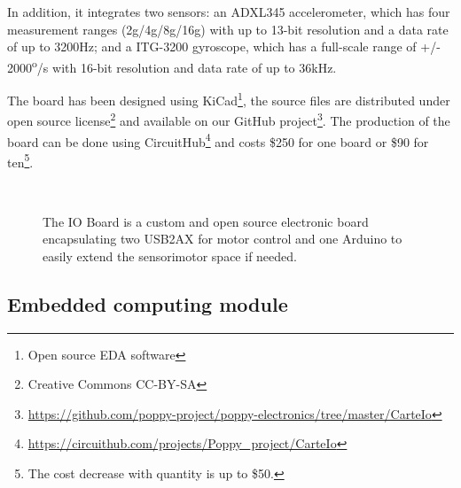 In addition, it integrates two sensors: an ADXL345 accelerometer, which has four measurement ranges (2g/4g/8g/16g) with up to 13-bit resolution and a data rate of up to 3200Hz; and a ITG-3200 gyroscope, which has a full-scale range of +/- 2000\textsuperscript{o}/s with 16-bit resolution and data rate of up to 36kHz.


The board has been designed using KiCad\footnote{Open source EDA software}, the source files are distributed under open source license\footnote{Creative Commons CC-BY-SA} and available on our GitHub project\footnote{\url{https://github.com/poppy-project/poppy-electronics/tree/master/CarteIo}}. The production of the board can be done using CircuitHub\footnote{\url{https://circuithub.com/projects/Poppy_project/CarteIo}} and costs \$250 for one board or \$90 for ten\footnote{The cost decrease with quantity is up to \$50.}.


\begin{figure}[p]
\centering
    \\
    \caption{The IO Board is a custom and open source electronic board encapsulating two USB2AX for motor control and one Arduino to easily extend the sensorimotor space if needed.}
    \label{fig:IO-board}
\end{figure}

\subsection{Embedded computing module} %

